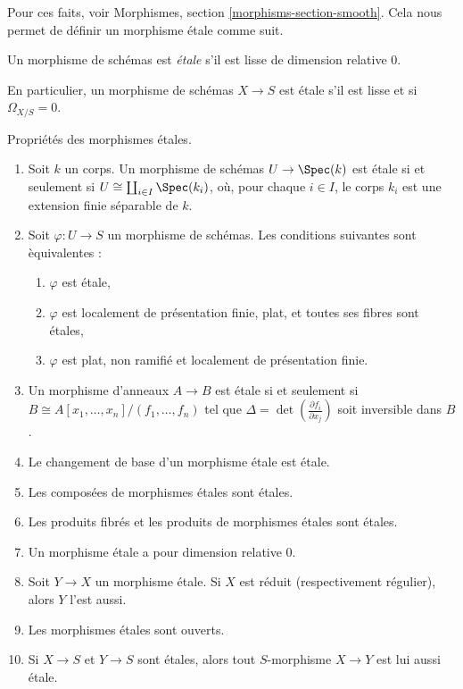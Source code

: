 \medskip\noindent
Pour ces faits, voir
Morphismes, section \ref{morphisms-section-smooth}.
Cela nous permet de d\'efinir un morphisme \'etale comme suit.

\begin{definition}
\label{definition-etale-morphism}
Un morphisme de sch\'emas est {\it \'etale} s'il est lisse de dimension relative 0.
\end{definition}

\noindent
En particulier, un morphisme de sch\'emas $X \to S$ est \'etale s'il est lisse
et si $\Omega_{X/S} = 0$.

\begin{proposition}
\label{proposition-etale-morphisms}
Propri\'et\'es des morphismes \'etales.
\begin{enumerate}
\item Soit $k$ un corps. Un morphisme de sch\'emas $U \to \Spec(k)$ est
\'etale si et seulement si $U \cong \coprod_{i \in I} \Spec(k_i)$,
o\`u, pour chaque $i \in I$,
le corps $k_i$ est une extension finie s\'eparable de $k$.
\item Soit $\varphi : U \to S$ un morphisme de sch\'emas. Les
conditions suivantes sont \`equivalentes :
\begin{enumerate}
\item $\varphi$ est \'etale,
\item $\varphi$ est localement de pr\'esentation finie, plat, et toutes ses fibres sont
\'etales,
\item $\varphi$ est plat, non ramifi\'e et localement de pr\'esentation finie.
\end{enumerate}
\item Un morphisme d'anneaux $A \to B$ est \'etale si et seulement si
$B \cong A[x_1, \ldots, x_n]/(f_1, \ldots, f_n)$
tel que $\Delta = \det \left( \frac{\partial f_i}{\partial x_j} \right)$
soit inversible dans $B$.
\item Le changement de base d'un morphisme \'etale est \'etale.
\item Les compos\'ees de morphismes \'etales sont \'etales.
\item Les produits fibr\'es et les produits de morphismes \'etales sont \'etales.
\item Un morphisme \'etale a pour dimension relative 0.
\item Soit $Y \to X$ un morphisme \'etale.
Si $X$ est r\'eduit (respectivement r\'egulier), alors $Y$ l'est aussi.
\item Les morphismes \'etales sont ouverts.
\item Si $X \to S$ et $Y \to S$ sont \'etales, alors tout
$S$-morphisme $X \to Y$ est lui aussi \'etale.
\end{enumerate}
\end{proposition}

